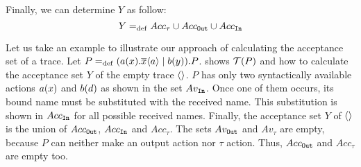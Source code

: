 Finally, we can determine $Y$ as follow:
\[Y =_{\mathrm{def}} Acc_\tau \cup Acc_{\mathtt{Out}} \cup Acc_{\mathtt{In}}\]

Let us take an example to illustrate our approach of calculating the acceptance set of a trace. Let $P=_{\mathrm{def}}(a(x).\overline{x}\langle a\rangle \mid b(y)).P$.   shows $\Traces[P]$ and how to calculate the acceptance set $Y$ of the empty trace $\overline{}\langle\rangle$. $P$ has only two syntactically available actions $a(x)$ and $b(d)$ as shown in the set $Av_{\mathtt{In}}$. Once one of them occurs, its bound name must be substituted with the received name. This substitution is shown in $Acc_{\mathtt{In}}$ for all possible received names. Finally, the acceptance set $Y$ of $\overline{}\langle\rangle$ is the union of $Acc_{\mathtt{Out}}$, $Acc_{\mathtt{In}}$ and $Acc_\tau$. 
The sets $Av_{\mathtt{Out}}$ and $Av_\tau$ are empty, because $P$ can neither make an output action nor $\tau$ action. Thus, $Acc_{\mathtt{Out}}$ and $Acc_\tau$ are empty too.
    
